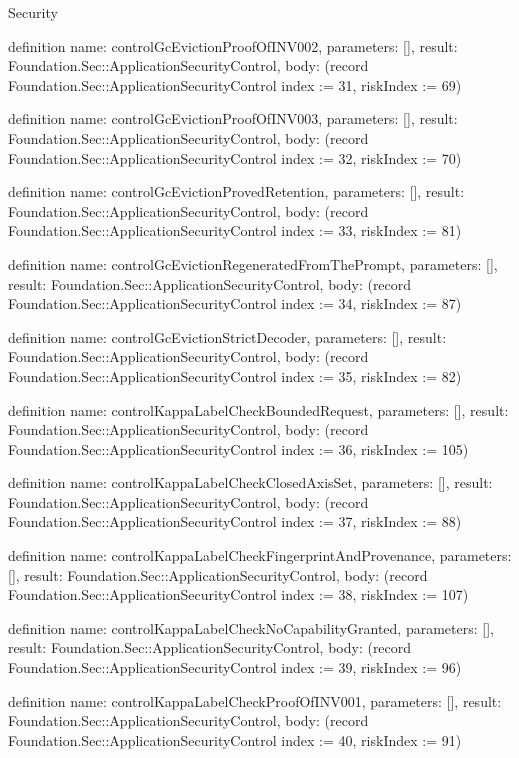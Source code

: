 \begin{lexlean}{Security}
\begin{semanticmodule}
definition{
  name: controlGcEvictionProofOfINV002,
  parameters: [],
  result: Foundation.Sec::ApplicationSecurityControl,
  body: (record Foundation.Sec::ApplicationSecurityControl {index := 31, riskIndex := 69})
}

definition{
  name: controlGcEvictionProofOfINV003,
  parameters: [],
  result: Foundation.Sec::ApplicationSecurityControl,
  body: (record Foundation.Sec::ApplicationSecurityControl {index := 32, riskIndex := 70})
}

definition{
  name: controlGcEvictionProvedRetention,
  parameters: [],
  result: Foundation.Sec::ApplicationSecurityControl,
  body: (record Foundation.Sec::ApplicationSecurityControl {index := 33, riskIndex := 81})
}

definition{
  name: controlGcEvictionRegeneratedFromThePrompt,
  parameters: [],
  result: Foundation.Sec::ApplicationSecurityControl,
  body: (record Foundation.Sec::ApplicationSecurityControl {index := 34, riskIndex := 87})
}

definition{
  name: controlGcEvictionStrictDecoder,
  parameters: [],
  result: Foundation.Sec::ApplicationSecurityControl,
  body: (record Foundation.Sec::ApplicationSecurityControl {index := 35, riskIndex := 82})
}

definition{
  name: controlKappaLabelCheckBoundedRequest,
  parameters: [],
  result: Foundation.Sec::ApplicationSecurityControl,
  body: (record Foundation.Sec::ApplicationSecurityControl {index := 36, riskIndex := 105})
}

definition{
  name: controlKappaLabelCheckClosedAxisSet,
  parameters: [],
  result: Foundation.Sec::ApplicationSecurityControl,
  body: (record Foundation.Sec::ApplicationSecurityControl {index := 37, riskIndex := 88})
}

definition{
  name: controlKappaLabelCheckFingerprintAndProvenance,
  parameters: [],
  result: Foundation.Sec::ApplicationSecurityControl,
  body: (record Foundation.Sec::ApplicationSecurityControl {index := 38, riskIndex := 107})
}

definition{
  name: controlKappaLabelCheckNoCapabilityGranted,
  parameters: [],
  result: Foundation.Sec::ApplicationSecurityControl,
  body: (record Foundation.Sec::ApplicationSecurityControl {index := 39, riskIndex := 96})
}

definition{
  name: controlKappaLabelCheckProofOfINV001,
  parameters: [],
  result: Foundation.Sec::ApplicationSecurityControl,
  body: (record Foundation.Sec::ApplicationSecurityControl {index := 40, riskIndex := 91})
}


\end{semanticmodule}
\end{lexlean}
